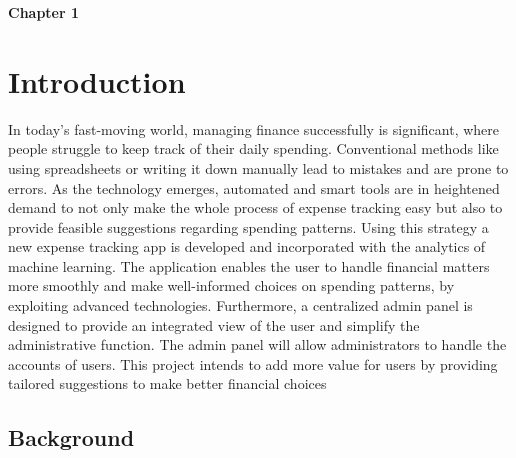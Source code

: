 \documentclass[12pt]{article}
\begin{document}
\newpage

\vspace*{2cm} %

\noindent
\LARGE \textbf{Chapter 1}

\vspace{0.5cm}

\noindent
\section{Introduction}


\vspace{1cm} %

\noindent
\normalsize In today’s fast-moving world, managing finance successfully is significant, where people struggle to keep track of their daily spending. Conventional methods like using spreadsheets or writing it down manually lead to mistakes and are prone to errors. As the technology emerges, automated and smart tools are in heightened demand to not only make the whole process of expense tracking easy but also to provide feasible suggestions regarding spending patterns. Using this strategy a new expense tracking app is developed and incorporated with the analytics of machine learning. The application enables the user to handle financial matters more smoothly and make well-informed choices on spending patterns, by exploiting advanced technologies\cite{albrecht2014smarter}.
Furthermore, a centralized admin panel is designed to provide an integrated view of the user and simplify the administrative function. The admin panel will allow administrators to handle the accounts of users. This project intends to add more value for users by providing tailored suggestions to make better financial choices \cite{johri2023expense}


\vspace{1cm} %

\noindent
\subsection{Background}

\vspace{0.5cm}
\end{document}
